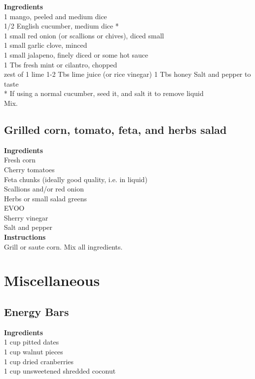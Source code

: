 \documentclass{article}
\numberwithin{figure}{section}
\numberwithin{equation}{section}
\begin{document}
{\bf Ingredients}\\
1 mango, peeled and medium dice\\
1/2 English cucumber, medium dice *\\
1 small red onion (or scallions or chives), diced small\\
1 small garlic clove, minced\\
1 small jalapeno, finely diced or some hot sauce\\
1 Tbs fresh mint or cilantro, chopped\\
zest of 1 lime
1-2 Tbs lime juice (or rice vinegar)
1 Tbs honey
Salt and pepper to taste\\

* If using a normal cucumber, seed it, and salt it to remove liquid\\

Mix.

\pagebreak
\subsection{Grilled corn, tomato, feta, and herbs salad}
{\bf Ingredients}\\
Fresh corn\\
Cherry tomatoes\\
Feta chunks (ideally good quality, i.e. in liquid)\\
Scallions and/or red onion\\
Herbs or small salad greens\\
EVOO\\
Sherry vinegar\\
Salt and pepper\\

{\bf Instructions}\\
Grill or saute corn. Mix all ingredients.

\pagebreak
\section{Miscellaneous}

\pagebreak
\subsection{Energy Bars}
{\bf Ingredients}\\
1 cup pitted dates\\
1 cup walnut pieces\\
1 cup dried cranberries\\
1 cup unsweetened shredded coconut\\
\end{document}
